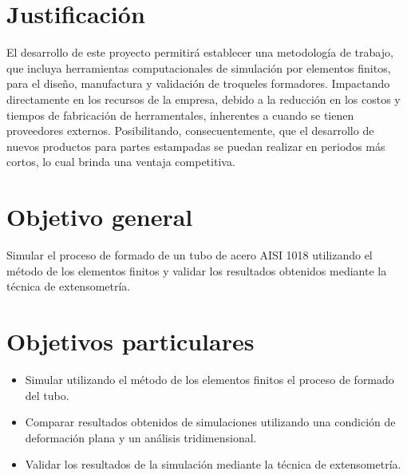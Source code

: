 \section{Justificación}

El desarrollo de este proyecto permitirá establecer una metodología de trabajo, que incluya herramientas computacionales 
de simulación por elementos finitos, para el diseño, manufactura y validación de troqueles formadores. Impactando directamente 
en los recursos de la empresa, debido a la reducción en los costos y tiempos de fabricación de herramentales, inherentes a cuando 
se tienen proveedores externos. Posibilitando, consecuentemente, que el desarrollo de nuevos productos para partes estampadas 
se puedan realizar en periodos más cortos, lo cual brinda una ventaja competitiva.



\section{Objetivo general}

Simular el proceso de formado de un tubo de acero AISI 1018 utilizando el método de los elementos finitos 
y validar los resultados obtenidos mediante la técnica de extensometría.

\section{Objetivos particulares}
\begin{itemize}
\item Simular utilizando el método de los elementos finitos el proceso de formado del tubo.
\item Comparar resultados obtenidos de simulaciones utilizando una condición de deformación plana y un análisis tridimensional.
\item Validar los resultados de la simulación mediante la técnica de extensometría.
\end{itemize}


